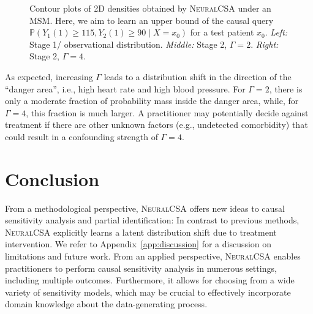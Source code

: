 \documentclass{article} %
\newcommand{\frameworkname}{\textsc{NeuralCSA}\xspace}
\theoremstyle{definition}
\theoremstyle{plain}
\begin{document}
\begin{figure}
\begin{subfigure}{0.25\textwidth}
\end{subfigure}
\caption{Contour plots of 2D densities obtained by \frameworkname under an MSM. Here, we aim to learn an upper bound of the causal query $\mathbb{P}(Y_1(1) \geq 115, Y_2(1) \geq 90 \mid X = x_0)$ for a test patient $x_0$. \emph{Left:} Stage 1/ observational distribution. \emph{Middle:} Stage 2, $\Gamma = 2$. \emph{Right:} Stage 2, $\Gamma = 4$.}
\label{fig:real}
\vspace{-0.2cm}
\end{figure}
As expected, increasing $\Gamma$ leads to a distribution shift in the direction of the ``danger area'', i.e., high heart rate and high blood pressure. For $\Gamma = 2$, there is only a moderate fraction of probability mass inside the danger area, while, for $\Gamma = 4$, this fraction is much larger. A practitioner may potentially decide against treatment if there are other unknown factors (e.g., undetected comorbidity) that could result in a confounding strength of $\Gamma = 4$.


\section{Conclusion}

From a methodological perspective, \frameworkname offers new ideas to causal sensitivity analysis and partial identification: In contrast to previous methods, \frameworkname explicitly learns a latent distribution shift due to treatment intervention. We refer to Appendix~\ref{app:discussion} for a discussion on limitations and future work. From an applied perspective, \frameworkname enables practitioners to perform causal sensitivity analysis in numerous settings, including multiple outcomes. Furthermore, it allows for choosing from a wide variety of sensitivity models, which may be crucial to effectively incorporate domain knowledge about the data-generating process.



\end{document}
